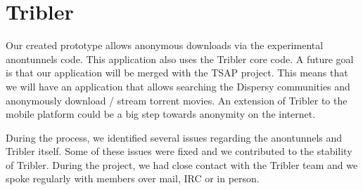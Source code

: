 \section{Tribler}
	Our created prototype allows anonymous downloads via the experimental anontunnels code. This application also uses the Tribler core code. A future goal is that our application will be merged with the TSAP project. This means that we will have an application that allows searching the Dispersy communities and anonymously download / stream torrent movies. An extension of Tribler to the mobile platform could be a big step towards anonymity on the internet.
	
	During the process, we identified several issues regarding the anontunnels and Tribler itself. Some of these issues were fixed and we contributed to the stability of Tribler. During the project, we had close contact with the Tribler team and we spoke regularly with members over mail, IRC or in person.